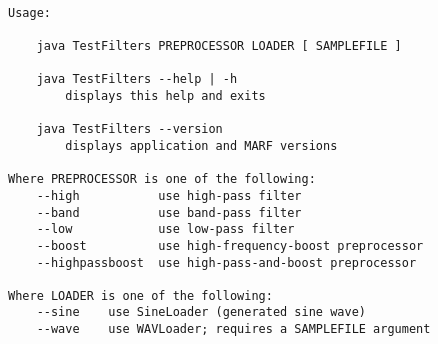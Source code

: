 \begin{verbatim}

Usage:

    java TestFilters PREPROCESSOR LOADER [ SAMPLEFILE ]

    java TestFilters --help | -h
        displays this help and exits

    java TestFilters --version
        displays application and MARF versions

Where PREPROCESSOR is one of the following:
    --high           use high-pass filter
    --band           use band-pass filter
    --low            use low-pass filter
    --boost          use high-frequency-boost preprocessor
    --highpassboost  use high-pass-and-boost preprocessor

Where LOADER is one of the following:
    --sine    use SineLoader (generated sine wave)
    --wave    use WAVLoader; requires a SAMPLEFILE argument

\end{verbatim}
